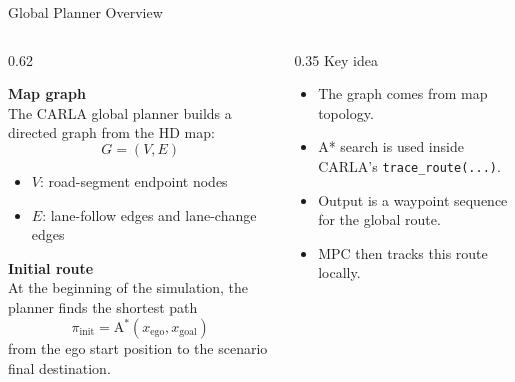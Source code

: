 \documentclass[aspectratio=169]{beamer}
\begin{document}
\begin{frame}{Global Planner Overview}
\small
\begin{columns}[T,onlytextwidth]
\begin{column}{0.62\textwidth}
\begin{flushleft}
\textbf{Map graph}\\[0.3em]
The CARLA global planner builds a directed graph from the HD map:
\[
G=(V,E)
\]
\begin{itemize}
\setlength\itemsep{0.3em}
\item $V$: road-segment endpoint nodes
\item $E$: lane-follow edges and lane-change edges
\end{itemize}

\textbf{Initial route}\\[0.3em]
At the beginning of the simulation, the planner finds the shortest path
\[
\pi_{\mathrm{init}}

=
\operatorname{A^*}(x_{\mathrm{ego}},x_{\mathrm{goal}})
\]
from the ego start position to the scenario final destination.
\end{flushleft}
\end{column}

\begin{column}{0.35\textwidth}
Key idea
\begin{itemize}
\setlength\itemsep{0.3em}
\item The graph comes from map topology.
\item A* search is used inside CARLA's \texttt{trace\_route(...)}.
\item Output is a waypoint sequence for the global route.
\item MPC then tracks this route locally.
\end{itemize}
\end{column}
\end{columns}
\end{frame}
\end{document}
